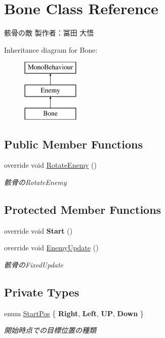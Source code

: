 \hypertarget{class_bone}{}\section{Bone Class Reference}
\label{class_bone}


骸骨の敵 製作者：冨田 大悟  


Inheritance diagram for Bone\+:\begin{figure}[H]
\begin{center}
\leavevmode
\includegraphics[height=3.000000cm]{class_bone}
\end{center}
\end{figure}
\subsection*{Public Member Functions}
\begin{DoxyCompactItemize}
\item 
override void \hyperlink{class_bone_adc5939e68918d95e811cce5bfb87f7e5}{Rotate\+Enemy} ()
\begin{DoxyCompactList}\small\item\em 骸骨の\+Rotate\+Enemy \end{DoxyCompactList}\end{DoxyCompactItemize}
\subsection*{Protected Member Functions}
\begin{DoxyCompactItemize}
\item 
\mbox{\label{class_bone_a08ec43a57f8b3099bac0514cf41a8084}} 
override void {\bfseries Start} ()
\item 
override void \hyperlink{class_bone_ae81be60a677bf474ff4634cea32921dc}{Enemy\+Update} ()
\begin{DoxyCompactList}\small\item\em 骸骨の\+Fixed\+Update \end{DoxyCompactList}\end{DoxyCompactItemize}
\subsection*{Private Types}
\begin{DoxyCompactItemize}
\item 
enum \hyperlink{class_bone_a4e9643808aa3b00b96fcd597c46f00b1}{Start\+Pos} \{ {\bfseries Right}, 
{\bfseries Left}, 
{\bfseries UP}, 
{\bfseries Down}
 \}\begin{DoxyCompactList}\small\item\em 開始時点での目標位置の種類 \end{DoxyCompactList}
\end{DoxyCompactItemize}
